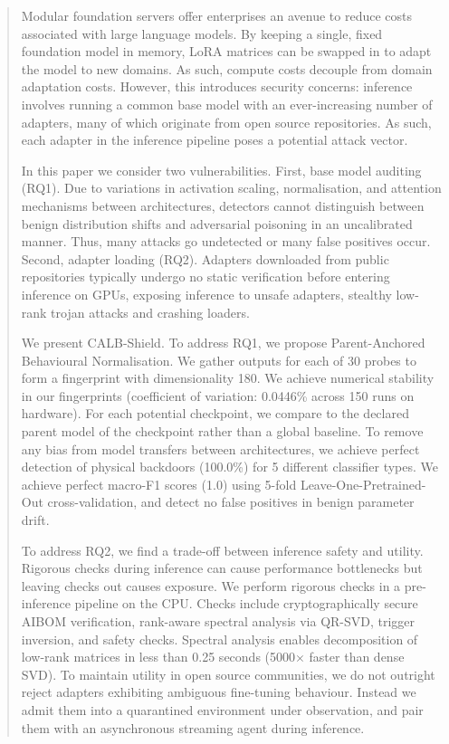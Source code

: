 \begin{abstract}
Modular foundation servers offer enterprises an avenue to reduce costs associated with large language models. By keeping a single, fixed foundation model in memory, LoRA matrices can be swapped in to adapt the model to new domains. As such, compute costs decouple from domain adaptation costs. However, this introduces security concerns: inference involves running a common base model with an ever-increasing number of adapters, many of which originate from open source repositories. As such, each adapter in the inference pipeline poses a potential attack vector.

In this paper we consider two vulnerabilities. First, base model auditing (RQ1). Due to variations in activation scaling, normalisation, and attention mechanisms between architectures, detectors cannot distinguish between benign distribution shifts and adversarial poisoning in an uncalibrated manner. Thus, many attacks go undetected or many false positives occur. Second, adapter loading (RQ2). Adapters downloaded from public repositories typically undergo no static verification before entering inference on GPUs, exposing inference to unsafe adapters, stealthy low-rank trojan attacks and crashing loaders.

We present CALB-Shield. To address RQ1, we propose Parent-Anchored Behavioural Normalisation. We gather outputs for each of 30 probes to form a fingerprint with dimensionality 180. We achieve numerical stability in our fingerprints (coefficient of variation: 0.0446\% across 150 runs on hardware). For each potential checkpoint, we compare to the declared parent model of the checkpoint rather than a global baseline. To remove any bias from model transfers between architectures, we achieve perfect detection of physical backdoors (100.0\%) for 5 different classifier types. We achieve perfect macro-F1 scores (1.0) using 5-fold Leave-One-Pretrained-Out cross-validation, and detect no false positives in benign parameter drift.

To address RQ2, we find a trade-off between inference safety and utility. Rigorous checks during inference can cause performance bottlenecks but leaving checks out causes exposure. We perform rigorous checks in a pre-inference pipeline on the CPU. Checks include cryptographically secure AIBOM verification, rank-aware spectral analysis via QR-SVD, trigger inversion, and safety checks. Spectral analysis enables decomposition of low-rank matrices in less than 0.25 seconds (5000$\times$ faster than dense SVD). To maintain utility in open source communities, we do not outright reject adapters exhibiting ambiguous fine-tuning behaviour. Instead we admit them into a quarantined environment under observation, and pair them with an asynchronous streaming agent during inference.


\end{abstract}
